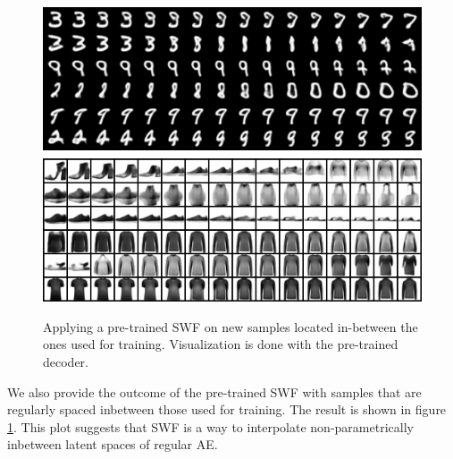 \begin{figure}
\centering
\includegraphics[width=0.95\columnwidth]{figures/interpolations.png}
\label{fig:interpolation}
\caption{Applying a pre-trained SWF on new samples located in-between the ones used for training. Visualization is done with the pre-trained decoder.}
\end{figure}

We also provide the outcome of the pre-trained SWF with samples that are regularly spaced inbetween those used for training. The result is shown in figure \ref{fig:interpolation}. This plot suggests that SWF is a way to interpolate non-parametrically inbetween latent spaces of regular AE.
























